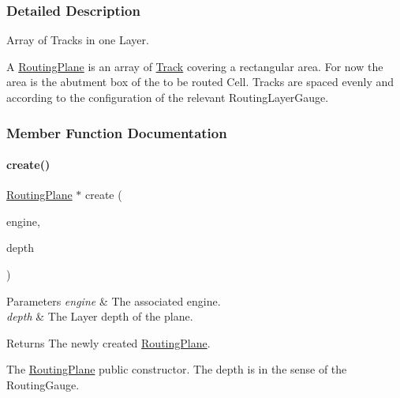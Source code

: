\subsubsection{Detailed Description}
Array of Tracks in one Layer. 

A \mbox{\hyperlink{classKite_1_1RoutingPlane}{Routing\+Plane}} is an array of \mbox{\hyperlink{classKite_1_1Track}{Track}} covering a rectangular area. For now the area is the abutment box of the to be routed Cell. Tracks are spaced evenly and according to the configuration of the relevant Routing\+Layer\+Gauge.



\subsubsection{Member Function Documentation}
\mbox{\label{classKite_1_1RoutingPlane_a91d1fdb3aac133a9f687207499caf1c4}} 
\paragraph{\texorpdfstring{create()}{create()}}
{\footnotesize\ttfamily \mbox{\hyperlink{classKite_1_1RoutingPlane}{Routing\+Plane}} $\ast$ create (\begin{DoxyParamCaption}\item[{\mbox{\hyperlink{classKite_1_1KiteEngine}{Kite\+Engine}} $\ast$}]{engine,  }\item[{size\+\_\+t}]{depth }\end{DoxyParamCaption})\hspace{0.3cm}{\ttfamily [static]}}


\begin{DoxyParams}{Parameters}
{\em engine} & The associated engine. \\
\hline
{\em depth} & The Layer depth of the plane. \\
\hline
\end{DoxyParams}
\begin{DoxyReturn}{Returns}
The newly created \mbox{\hyperlink{classKite_1_1RoutingPlane}{Routing\+Plane}}.
\end{DoxyReturn}
The \mbox{\hyperlink{classKite_1_1RoutingPlane}{Routing\+Plane}} public constructor. The {\ttfamily depth} is in the sense of the Routing\+Gauge. \mbox{\label{classKite_1_1RoutingPlane_a21b9cefd33ae22e4c2070ad441bdd30b}} 
